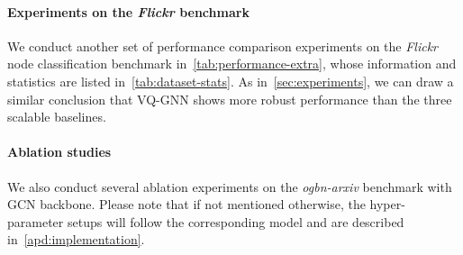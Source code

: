 \documentclass{article}
\newcommand{\cm}{\paragraph}
\begin{document}
\cm{Experiments on the \textit{Flickr} benchmark}
We conduct another set of performance comparison experiments on the \textit{Flickr} node classification benchmark in~\cref{tab:performance-extra}, whose information and statistics are listed in~\cref{tab:dataset-stats}. As in~\cref{sec:experiments}, we can draw a similar conclusion that VQ-GNN shows more robust performance than the three scalable baselines.
\begin{table}[ht]
\centering
\caption{\label{tab:performance-extra}Performance comparison between sampling-based baselines and our approach, VQ-GNN, on the \textit{Flickr} benchmark.}
\end{table}

\cm{Ablation studies}
We also conduct several ablation experiments on the \textit{ogbn-arxiv} benchmark with GCN backbone. Please note that if not mentioned otherwise, the hyper-parameter setups will follow the corresponding model and are described in~\cref{apd:implementation}.
\end{document}
